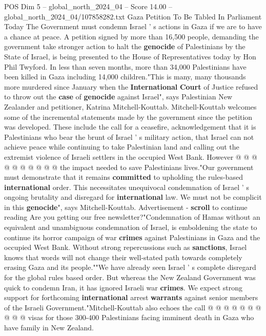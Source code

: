 \begin{textsample}{POS Dim 5 – global\_north\_2024\_04 – Score 14.00 – global\_north\_2024\_04/107858282.txt}  \label{ex:f5_pos_285}
Gaza Petition To Be Tabled In Parliament Today The Government must condemn Israel ' s actions in Gaza if we are to have a chance at peace.
A petition signed by more than 16,500 people, demanding the government take stronger action to halt the \textbf{genocide} of Palestinians by the State of Israel, is being presented to the House of Representatives today by Hon Phil Twyford.
In less than seven months, more than 34,000 Palestinians have been killed in Gaza including 14,000 children."This is many, many thousands more murdered since January when the \textbf{International} \textbf{Court} of Justice refused to throw out the \textbf{case} of \textbf{genocide} against Israel", says Palestinian New Zealander and petitioner, Katrina Mitchell-Kouttab.
Mitchell-Kouttab welcomes some of the incremental statements made by the government since the petition was developed.
These include the call for a ceasefire, acknowledgement that it is Palestinians who bear the brunt of Israel ' s military action, that Israel can not achieve peace while continuing to take Palestinian land and calling out the extremist violence of Israeli settlers in the occupied West Bank.
However @ @ @ @ @ @ @ @ @ @ the impact needed to save Palestinians lives."Our government must demonstrate that it remains \textbf{committed} to upholding the rules-based \textbf{international} order.
This necessitates unequivocal condemnation of Israel ' s ongoing brutality and disregard for \textbf{international} law.
We must not be complicit in this \textbf{genocide}", says Mitchell-Kouttab.
Advertisement - \textbf{scroll} to continue reading Are you getting our free newsletter?"Condemnation of Hamas without an equivalent and unambiguous condemnation of Israel, is emboldening the state to continue its horror campaign of war \textbf{crimes} against Palestinians in Gaza and the occupied West Bank.
Without strong repercussions such as \textbf{sanctions}, Israel knows that words will not change their well-stated path towards completely erasing Gaza and its people.""We have already seen Israel ' s complete disregard for the global rules based order.
But whereas the New Zealand Government was quick to condemn Iran, it has ignored Israeli war \textbf{crimes}.
We expect strong support for forthcoming \textbf{international} arrest \textbf{warrants} against senior members of the Israeli Government."Mitchell-Kouttab also echoes the call @ @ @ @ @ @ @ @ @ @ visas for those 300-400 Palestinians facing imminent death in Gaza who have family in New Zealand.

\end{textsample}
